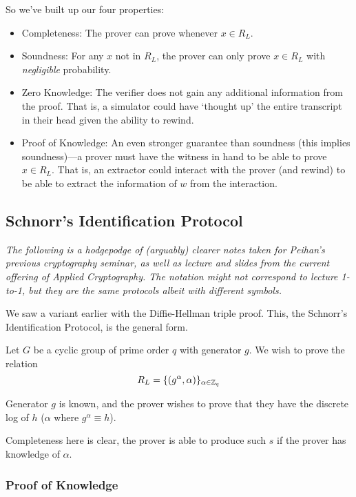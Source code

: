 So we've built up our four properties:
\begin{itemize}
    \item Completeness: The prover can prove whenever $x\in R_L$.
    \item Soundness: For any $x$ not in $R_L$, the prover can only prove $x\in R_L$ with \emph{negligible} probability.
    \item Zero Knowledge: The verifier does not gain any additional information from the proof. That is, a simulator could have `thought up' the entire transcript in their head given the ability to rewind.
    \item Proof of Knowledge: An even stronger guarantee than soundness (this implies soundness)---a prover must have the witness in hand to be able to prove $x\in R_L$. That is, an extractor could interact with the prover (and rewind) to be able to extract the information of $w$ from the interaction.
\end{itemize}

\subsection{Schnorr's Identification Protocol}\label{sec:mar7-schnorr}
\begin{remark*}
    \emph{The following is a hodgepodge of (arguably) clearer notes taken for Peihan's previous cryptography seminar, as well as lecture and slides from the current offering of Applied Cryptography. The notation might not correspond to lecture 1-to-1, but they are the same protocols albeit with different symbols.}
\end{remark*}
We saw a variant earlier with the Diffie-Hellman triple proof. This, the Schnorr's Identification Protocol, is the general form.

Let $G$ be a cyclic group of prime order $q$ with generator $g$. We wish to prove the relation
\[R_L = \{(g^\alpha, \alpha)\}_{\alpha\in \mathbb Z_q}\]

Generator $g$ is known, and the prover wishes to prove that they have the discrete log of $h$ ($\alpha$ where $g^\alpha\equiv h$).


Completeness here is clear, the prover is able to produce such $s$ if the prover has knowledge of $\alpha$.

\subsubsection{Proof of Knowledge}

